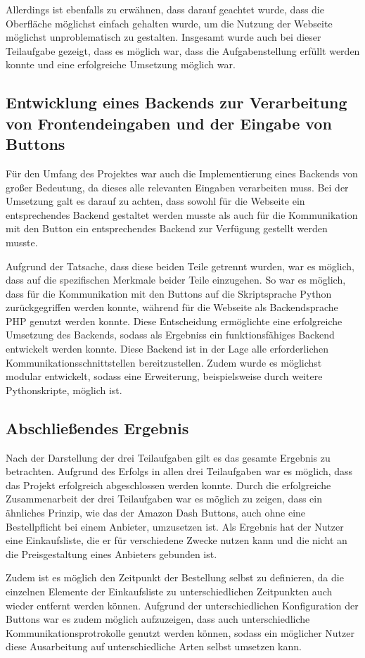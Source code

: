 Allerdings ist ebenfalls zu erwähnen, dass darauf geachtet wurde, dass die Oberfläche möglichst einfach gehalten wurde, um die Nutzung der Webseite möglichst unproblematisch zu gestalten. 
Insgesamt wurde auch bei dieser Teilaufgabe gezeigt, dass es möglich war, dass die Aufgabenstellung erfüllt werden konnte und eine erfolgreiche Umsetzung möglich war.

\subsection{Entwicklung eines Backends zur Verarbeitung von Frontendeingaben und der Eingabe von Buttons}
\label{sec:ErgebnisBackend}
Für den Umfang des Projektes war auch die Implementierung eines Backends von großer Bedeutung, da dieses alle relevanten Eingaben verarbeiten muss. Bei der Umsetzung galt es darauf zu achten, dass sowohl für die Webseite ein entsprechendes Backend gestaltet werden musste als auch für die Kommunikation mit den Button ein entsprechendes Backend zur Verfügung gestellt werden musste. 

Aufgrund der Tatsache, dass diese beiden Teile getrennt wurden, war es möglich, dass auf die spezifischen Merkmale beider Teile einzugehen. So war es möglich, dass für die Kommunikation mit den Buttons auf die Skriptsprache Python zurückgegriffen werden konnte, während für die Webseite als Backendsprache \ac{PHP} genutzt werden konnte. Diese Entscheidung ermöglichte eine erfolgreiche Umsetzung des Backends, sodass als Ergebniss ein funktionsfähiges Backend entwickelt werden konnte. Diese Backend ist in der Lage alle erforderlichen Kommunikationsschnittstellen bereitzustellen. Zudem wurde es möglichst modular entwickelt, sodass eine Erweiterung, beispielsweise durch weitere Pythonskripte, möglich ist. 

\subsection{Abschließendes Ergebnis}
\label{sec:ErgebnisAbschluss}
Nach der Darstellung der drei Teilaufgaben gilt es das gesamte Ergebnis zu betrachten. Aufgrund des Erfolgs in allen drei Teilaufgaben war es möglich, dass das Projekt erfolgreich abgeschlossen werden konnte. Durch die erfolgreiche Zusammenarbeit der drei Teilaufgaben war es möglich zu zeigen, dass ein ähnliches Prinzip, wie das der Amazon Dash Buttons, auch ohne eine Bestellpflicht bei einem Anbieter, umzusetzen ist. Als Ergebnis hat der Nutzer eine Einkaufsliste, die er für verschiedene Zwecke nutzen kann und die nicht an die Preisgestaltung eines Anbieters gebunden ist. 

Zudem ist es möglich den Zeitpunkt der Bestellung selbst zu definieren, da die einzelnen Elemente der Einkaufsliste zu unterschiedlichen Zeitpunkten auch wieder entfernt werden können. 
Aufgrund der unterschiedlichen Konfiguration der Buttons war es zudem möglich aufzuzeigen, dass auch unterschiedliche Kommunikationsprotrokolle genutzt werden können, sodass ein möglicher Nutzer diese Ausarbeitung auf unterschiedliche Arten selbst umsetzen kann. 
